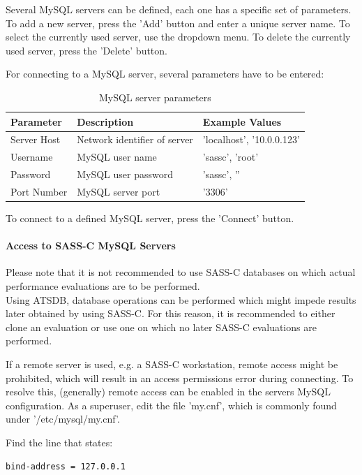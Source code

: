 Several MySQL servers can be defined, each one has a specific set of parameters. To add a new server, press the 'Add' button and enter a unique server name. To select the currently used server, use the dropdown menu. To delete the currently used server, press the 'Delete' button.

For connecting to a MySQL server, several parameters have to be entered:

\begin{table}[H]
  \center
  \begin{tabular}{ | l | l | l |}
    \hline
    \textbf{Parameter} & \textbf{Description} & \textbf{Example Values} \\ \hline
    Server Host & Network identifier of server & 'localhost', '10.0.0.123' \\ \hline
    Username & MySQL user name & 'sassc', 'root' \\ \hline
    Password & MySQL user password & 'sassc', '' \\ \hline
    Port Number & MySQL server port & '3306' \\
    \hline
  \end{tabular}
  \caption{MySQL server parameters}
\end{table}

To connect to a defined MySQL server, press the 'Connect' button.\\

\paragraph{Access to SASS-C MySQL Servers}

Please note that it is not recommended to use SASS-C databases on which actual performance evaluations are to be performed. \\
Using ATSDB, database operations can be performed which might impede results later obtained by using SASS-C. For this reason, it is recommended to either clone an evaluation or use one on which no later SASS-C evaluations are performed.

If a remote server is used, e.g. a SASS-C workstation, remote access might be prohibited, which will result in an access permissions error during connecting. To resolve this, (generally) remote access can be enabled in the servers MySQL configuration. As a superuser, edit the file 'my.cnf', which is commonly found under '/etc/mysql/my.cnf'. 

Find the line that states:
\begin{lstlisting}
bind-address = 127.0.0.1
\end{lstlisting}

